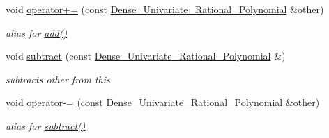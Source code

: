 \begin{Indent}
\begin{DoxyCompactItemize}
void \hyperlink{group__polygroup_a61d2068402442a595dde1fcc4dc40f52}{operator+=} (const \hyperlink{group__polygroup_class_dense___univariate___rational___polynomial}{Dense\+\_\+\+Univariate\+\_\+\+Rational\+\_\+\+Polynomial} \&other)
\begin{DoxyCompactList}\small\item\em alias for \hyperlink{group__polygroup_a8cf0a014475645d777b7f3168d632a93}{add()} \end{DoxyCompactList}\item 
\mbox{\label{group__polygroup_aab4902fd7521146ea739f9f3f8c0c8b6}} 
void \hyperlink{group__polygroup_aab4902fd7521146ea739f9f3f8c0c8b6}{subtract} (const \hyperlink{group__polygroup_class_dense___univariate___rational___polynomial}{Dense\+\_\+\+Univariate\+\_\+\+Rational\+\_\+\+Polynomial} \&)
\begin{DoxyCompactList}\small\item\em subtracts {\ttfamily other} from {\ttfamily this} \end{DoxyCompactList}\item 
\mbox{\label{group__polygroup_a7bb6d8ed216e5575773013a19052e79c}} 
void \hyperlink{group__polygroup_a7bb6d8ed216e5575773013a19052e79c}{operator-\/=} (const \hyperlink{group__polygroup_class_dense___univariate___rational___polynomial}{Dense\+\_\+\+Univariate\+\_\+\+Rational\+\_\+\+Polynomial} \&other)
\begin{DoxyCompactList}\small\item\em alias for \hyperlink{group__polygroup_aab4902fd7521146ea739f9f3f8c0c8b6}{subtract()} \end{DoxyCompactList}\end{DoxyCompactItemize}
\end{Indent}
